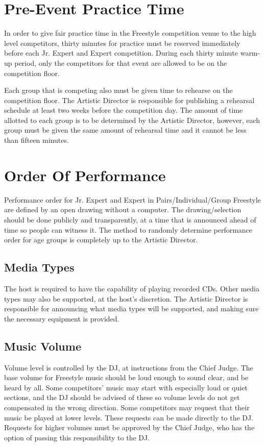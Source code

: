 \section{Pre-Event Practice Time}
In order to give fair practice time in the Freestyle competition venue to the high level competitors, thirty minutes for practice must be reserved immediately before each Jr. Expert and Expert competition.
During each thirty minute warm-up period, only the competitors for that event are allowed to be on the competition floor.

Each group that is competing also must be given time to rehearse on the competition floor.
The Artistic Director is responsible for publishing a rehearsal schedule at least two weeks before the competition day.
The amount of time allotted to each group is to be determined by the Artistic Director, however, each group must be given the same amount of rehearsal time and it cannot be less than fifteen minutes.

\section{Order Of Performance}
Performance order for Jr. Expert and Expert in Pairs/Individual/Group Freestyle are defined by an open drawing without a computer. %
The drawing/selection should be done publicly and transparently, at a time that is announced ahead of time so people can witness it.
The method to randomly determine performance order for age groups is completely up to the Artistic Director.

\subsection{Media Types} %
The host is required to have the capability of playing recorded CDs.
Other media types may also be supported, at the host's discretion.
The Artistic Director is responsible for announcing what media types will be supported, and making sure the necessary equipment is provided.

\subsection{Music Volume} %
Volume level is controlled by the DJ, at instructions from the Chief Judge.
The base volume for Freestyle music should be loud enough to sound clear, and be heard by all.
Some competitors' music may start with especially loud or quiet sections, and the DJ should be advised of these so volume levels do not get compensated in the wrong direction.
Some competitors may request that their music be played at lower levels.
These requests can be made directly to the DJ.
Requests for higher volumes must be approved by the Chief Judge, who has the option of passing this responsibility to the DJ.

